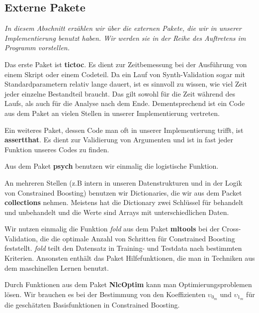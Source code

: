 \documentclass[12pt,a4paper,twoside]{scrartcl}
\numberwithin{equation}{section}
\begin{document}
\subsection{Externe Pakete}\label{subsec:externePaketen}

\noindent
\emph{In diesem Abschnitt erzählen wir über die externen Pakete, die wir in unserer Implementierung benutzt haben. Wir werden sie in der Reihe des Auftretens im Programm vorstellen.}\par

\noindent
Das erste Paket ist \textbf{tictoc}. Es dient zur Zeitbemessung bei der Ausführung von einem Skript oder einem Codeteil. Da ein Lauf von Synth-Validation sogar mit Standardparametern relativ lange dauert, ist es sinnvoll zu wissen, wie viel Zeit jeder einzelne Bestandteil braucht. Das gilt sowohl für die Zeit während des Laufs, als auch für die Analyse nach dem Ende. Dementsprechend ist ein Code aus dem Paket an vielen Stellen in unserer Implementierung vertreten.
\par

\noindent
Ein weiteres Paket, dessen Code man oft in unserer Implementierung trifft, ist \textbf{assertthat}. Es dient zur Validierung von Argumenten und ist in fast jeder Funktion unseres Codes zu finden.
\par

\noindent
Aus dem Paket \textbf{psych} benutzen wir einmalig die logistische Funktion.\par 

\noindent
An mehreren Stellen (z.B intern in unseren Datenstrukturen und in der Logik von Constrained Boosting) benutzen wir Dictionaries, die wir aus dem Packet \textbf{collections} nehmen. Meistens hat die Dictionary zwei Schlüssel für behandelt und unbehandelt und die Werte sind Arrays mit unterschiedlichen Daten.\par

\noindent
Wir nutzen einmalig die Funktion \emph{fold} aus dem Paket \textbf{mltools} bei der Cross-Validation, die die optimale Anzahl von Schritten für Constrained Boosting feststellt. \emph{fold} teilt den Datensatz in Training- und Testdata nach bestimmten Kriterien. Ansonsten enthält das Paket Hilfefunktionen, die man in Techniken aus dem maschinellen Lernen benutzt.\par 
 
\noindent
Durch Funktionen aus dem Paket \textbf{NlcOptim} kann man Optimierungsproblemen lösen. Wir brauchen es bei der Bestimmung von den Koeffizienten $\upsilon_{0_m}$ und $\upsilon_{1_m}$ für die geschätzten Basisfunktionen in Constrained Boosting.\par 
 
\end{document}
